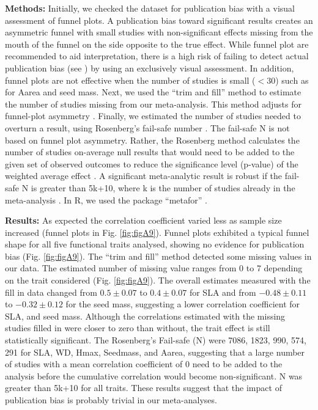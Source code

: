 \documentclass[a4paper,11pt]{article}
\begin{document}
\begin{appendices}
\noindent\textbf{Methods:} Initially, we checked the dataset for publication bias with a visual assessment of funnel plots. A publication bias toward significant results creates an asymmetric funnel with small studies with non-significant effects missing from the mouth of the funnel on the side opposite to the true effect. While funnel plot are recommended to aid interpretation, there is a high risk of failing to detect actual publication bias (see \citealt{Koricheva:2013tz}) by using an exclusively visual assessment. In addition, funnel plots are not effective when the number of studies is small ($<30$) such as for Aarea and seed mass.
Next, we used the ``trim and fill'' method to estimate the number of studies missing from our meta-analysis. This method adjusts for funnel-plot asymmetry \citep{Duval:2000dg}.
Finally, we estimated the number of studies needed to overturn a result, using Rosenberg's fail-safe number \citep{Rosenberg:2005hk}. The fail-safe N is not based on funnel plot asymmetry. Rather, the Rosenberg method calculates the number of studies on-average null results that would need to be added to the given set of observed outcomes to reduce the significance level (p-value) of the weighted average effect \citep{Rosenberg:2005hk}. A significant meta-analytic result is robust if the fail-safe N is greater than 5k+10, where k is the number of studies already in the meta-analysis \citep{Rosenthal:1979do}.
In R, we used the package ``metafor''  \citep{Viechtbauer-2010}.

\noindent\textbf{Results:} As expected the correlation coefficient varied less as sample size increased (funnel plots in Fig. \ref{fig:figA9}). Funnel plots exhibited a typical funnel shape for all five functional traits analysed, showing no evidence for publication bias (Fig. \ref{fig:figA9}).
The ``trim and fill'' method detected some missing values in our data. The estimated number of missing value ranges from 0 to 7 depending on the trait considered (Fig. \ref{fig:figA9}). The overall estimates measured with the fill in data changed from $0.5 \pm 0.07$  to $0.4 \pm 0.07$ for SLA and from $-0.48 \pm 0.11$ to $-0.32 \pm 0.12$ for the seed mass, suggesting a lower correlation coefficient for SLA, and seed mass. Although the correlations estimated with the missing studies filled in were closer to zero than without, the trait effect is still statistically significant.
The Rosenberg's Fail-safe (N) were 7086, 1823, 990, 574, 291 for SLA, WD, Hmax, Seedmass, and Aarea, suggesting that a large number of studies with a mean correlation coefficient of 0 need to be added to the analysis before the cumulative correlation would become non-significant. N was greater than 5k+10 for all traits.
These results suggest that the impact of publication bias is probably trivial in our meta-analyses.


\end{appendices}
\end{document}
